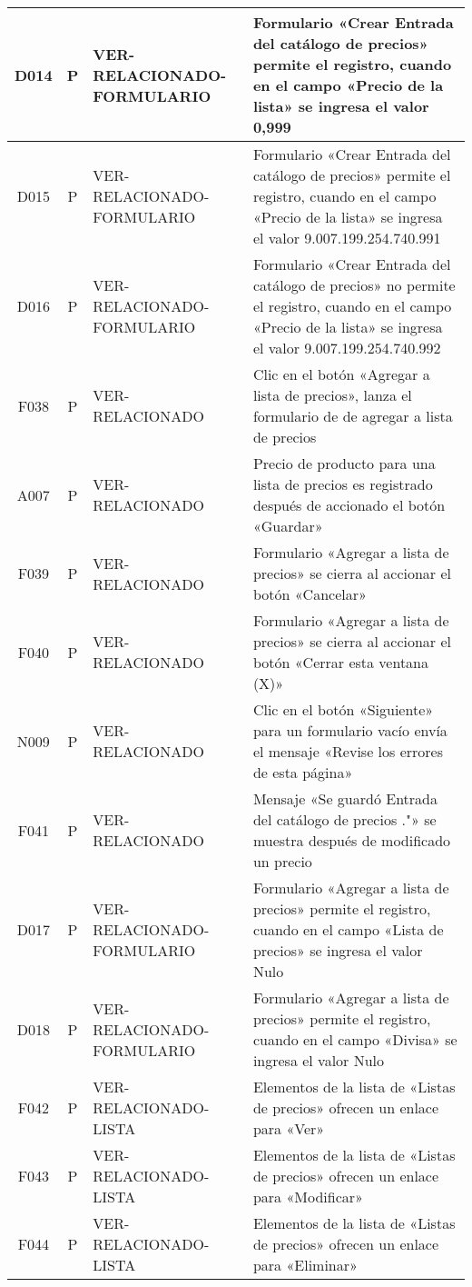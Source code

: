 \begin{landscape}
{\begin{longtable}[htb]{|c|c|p{5.0cm}|p{14.0cm}|}
D014 & P & VER-RELACIONADO-FORMULARIO & Formulario «Crear Entrada del catálogo de precios» permite el registro, cuando en el campo «Precio de la lista» se ingresa el valor 0,999 \\ \hline
D015 & P & VER-RELACIONADO-FORMULARIO & Formulario «Crear Entrada del catálogo de precios» permite el registro, cuando en el campo «Precio de la lista» se ingresa el valor 9.007.199.254.740.991 \\ \hline
D016 & P & VER-RELACIONADO-FORMULARIO & Formulario «Crear Entrada del catálogo de precios» no permite el registro, cuando en el campo «Precio de la lista» se ingresa el valor 9.007.199.254.740.992 \\ \hline
F038 & P & VER-RELACIONADO & Clic en el botón «Agregar a lista de precios», lanza el formulario de de agregar a lista de precios \\ \hline
A007 & P & VER-RELACIONADO & Precio de producto para una lista de precios es registrado después de accionado el botón «Guardar» \\ \hline
F039 & P & VER-RELACIONADO & Formulario «Agregar a lista de precios» se cierra al accionar el botón «Cancelar» \\ \hline
F040 & P & VER-RELACIONADO & Formulario «Agregar a lista de precios» se cierra al accionar el botón «Cerrar esta ventana (X)» \\ \hline
N009 & P & VER-RELACIONADO & Clic en el botón «Siguiente» para un formulario vacío envía el mensaje «Revise los errores de esta página» \\ \hline
F041 & P & VER-RELACIONADO & Mensaje «Se guardó Entrada del catálogo de precios ."» se muestra después de modificado un precio \\ \hline
D017 & P & VER-RELACIONADO-FORMULARIO & Formulario «Agregar a lista de precios» permite el registro, cuando en el campo «Lista de precios» se ingresa el valor Nulo \\ \hline
D018 & P & VER-RELACIONADO-FORMULARIO & Formulario «Agregar a lista de precios» permite el registro, cuando en el campo «Divisa» se ingresa el valor Nulo \\ \hline
F042 & P & VER-RELACIONADO-LISTA & Elementos de la lista de «Listas de precios» ofrecen un enlace para «Ver» \\ \hline
F043 & P & VER-RELACIONADO-LISTA & Elementos de la lista de «Listas de precios» ofrecen un enlace para «Modificar» \\ \hline
F044 & P & VER-RELACIONADO-LISTA & Elementos de la lista de «Listas de precios» ofrecen un enlace para «Eliminar» \\ \hline

\end{longtable}}
\end{landscape}
